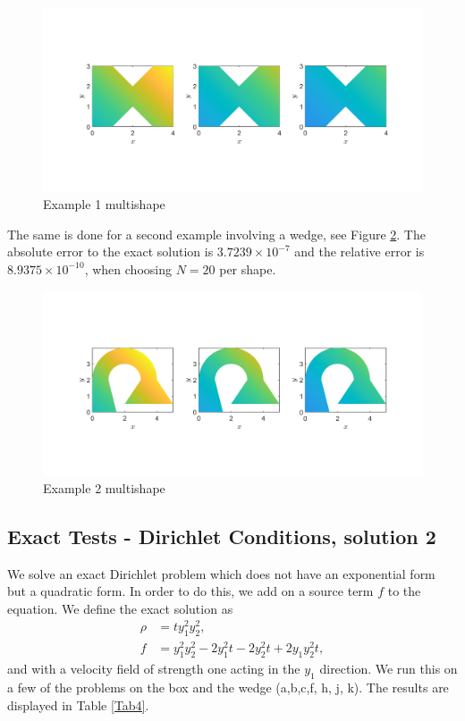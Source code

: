 \documentclass[11pt, a4paper]{article}
\theoremstyle{definition}
\begin{document}
\begin{figure}[h]
	\centering
	\includegraphics[scale=0.35]{example1.png}
	\caption{Example 1 multishape} 
	\label{F6}
\end{figure}
The same is done for a second example involving a wedge, see Figure \ref{F7}. The absolute error to the exact solution is $3.7239 \times 10^{-7}$ and the relative error is $8.9375 \times 10^{-10}$, when choosing $N= 20$ per shape. 

\begin{figure}[h]
	\centering
	\includegraphics[scale=0.35]{example2.png}
	\caption{Example 2 multishape} 
	\label{F7}
\end{figure}


\subsection{Exact Tests - Dirichlet Conditions, solution 2}

We solve an exact Dirichlet problem which does not have an exponential form but a quadratic form. In order to do this, we add on a source term $f$ to the equation.
We define the exact solution as
\begin{align*}
	\rho &= t y_1^2 y_2^2,\\
	f &= y_1^2 y_2^2 - 2 y_1^2 t - 2 y_2^2 t + 2 y_1 y_2^2 t,
\end{align*}
and with a velocity field of strength one acting in the $y_1$ direction.
We run this on a few of the problems on the box and the wedge (a,b,c,f, h, j, k). The results are displayed in Table \ref{Tab4}.
\end{document}
